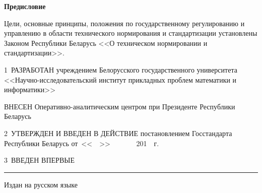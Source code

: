 \centerline{\bf Предисловие} 
Цели, основные принципы, положения по государственному регулированию и управлению в 
области технического нормирования и стандартизации установлены Законом 
Республики Беларусь <<О техническом нормировании и стандартизации>>. 

\vskip0.2cm

1~РАЗРАБОТАН учреждением Белорусского государственного университета 
<<Научно-исследовательский  институт прикладных проблем математики и 
информатики>>

ВНЕСЕН Оперативно-аналитическим центром при Президенте 
Республики Беларусь

2~УТВЕРЖДЕН И ВВЕДЕН В ДЕЙСТВИЕ постановлением Госстандарта Республики 
Беларусь от~<<$\phantom{\text{09}}$>>       
$\phantom{\text{января}}$~201$\phantom{\text{8}}$~г. 
\No~$\phantom{\text{9}}$ 

3~ВВЕДЕН ВПЕРВЫЕ

\vfill


\hrule
\vskip1mm
Издан на русском языке

\pagebreak

\pagebreak
